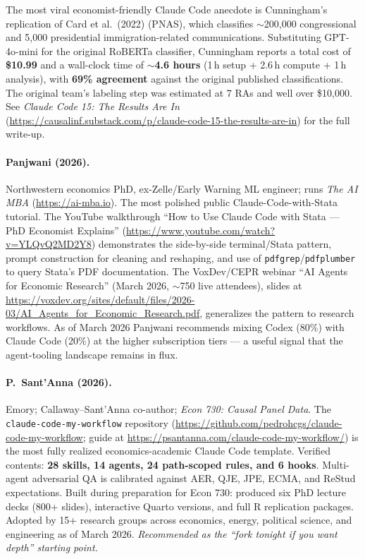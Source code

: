 \documentclass[11pt]{article}
\begin{document}
The most viral economist-friendly Claude Code anecdote is Cunningham's replication of Card et al.\ (2022) (PNAS), which classifies $\sim$200{,}000 congressional and 5{,}000 presidential immigration-related communications. Substituting GPT-4o-mini for the original RoBERTa classifier, Cunningham reports a total cost of \textbf{\$10.99} and a wall-clock time of \textbf{$\sim$4.6 hours} (1\,h setup + 2.6\,h compute + 1\,h analysis), with \textbf{69\% agreement} against the original published classifications. The original team's labeling step was estimated at 7 RAs and well over \$10{,}000. See \emph{Claude Code 15: The Results Are In} (\url{https://causalinf.substack.com/p/claude-code-15-the-results-are-in}) for the full write-up.

\paragraph{Panjwani (2026).} Northwestern economics PhD, ex-Zelle/Early Warning ML engineer; runs \emph{The AI MBA} (\url{https://ai-mba.io}). The most polished public Claude-Code-with-Stata tutorial. The YouTube walkthrough ``How to Use Claude Code with Stata --- PhD Economist Explains'' (\url{https://www.youtube.com/watch?v=YLQvQ2MD2Y8}) demonstrates the side-by-side terminal/Stata pattern, prompt construction for cleaning and reshaping, and use of \texttt{pdfgrep}/\texttt{pdfplumber} to query Stata's PDF documentation. The VoxDev/CEPR webinar ``AI Agents for Economic Research'' (March 2026, $\sim$750 live attendees), slides at \url{https://voxdev.org/sites/default/files/2026-03/AI_Agents_for_Economic_Research.pdf}, generalizes the pattern to research workflows. As of March 2026 Panjwani recommends mixing Codex (80\%) with Claude Code (20\%) at the higher subscription tiers --- a useful signal that the agent-tooling landscape remains in flux.

\paragraph{P.\ Sant'Anna (2026).} Emory; Callaway--Sant'Anna co-author; \emph{Econ 730: Causal Panel Data}. The \texttt{claude-code-my-workflow} repository (\url{https://github.com/pedrohcgs/claude-code-my-workflow}; guide at \url{https://psantanna.com/claude-code-my-workflow/}) is the most fully realized economics-academic Claude Code template. Verified contents: \textbf{28 skills, 14 agents, 24 path-scoped rules, and 6 hooks}. Multi-agent adversarial QA is calibrated against AER, QJE, JPE, ECMA, and ReStud expectations. Built during preparation for Econ 730: produced six PhD lecture decks (800+ slides), interactive Quarto versions, and full R replication packages. Adopted by 15+ research groups across economics, energy, political science, and engineering as of March 2026. \emph{Recommended as the ``fork tonight if you want depth'' starting point.}
\end{document}
